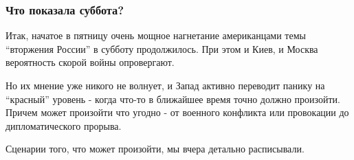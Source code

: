  
 
 
 
 

\subsubsection{Что показала суббота?}

Итак, начатое в пятницу очень мощное нагнетание американцами темы \enquote{вторжения
России} в субботу продолжилось. При этом и Киев, и Москва вероятность скорой
войны опровергают.

Но их мнение уже никого не волнует, и Запад активно переводит панику на
\enquote{красный} уровень - когда что-то в ближайшее время точно должно произойти.
Причем может произойти что угодно - от военного конфликта или провокации до
дипломатического прорыва. 

Сценарии того, что может произойти, мы вчера детально расписывали. 
